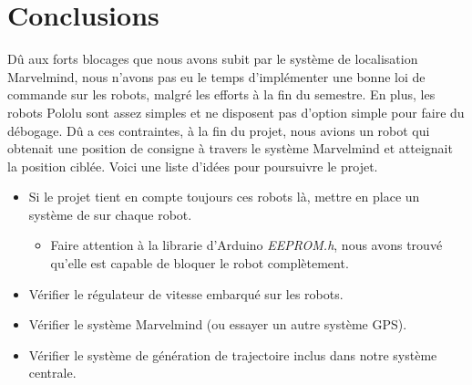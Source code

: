 \section{Conclusions}

Dû aux forts blocages que nous avons subit par le système de localisation Marvelmind, nous n'avons pas eu le temps d'implémenter une bonne loi de commande sur les robots, malgré les efforts à la fin du semestre. En plus, les robots Pololu sont assez simples et ne disposent pas d'option simple pour faire du débogage. Dû a ces contraintes, à la fin du projet, nous avions un robot qui obtenait une position de consigne à travers le système Marvelmind et atteignait la position ciblée. Voici une liste d'idées pour poursuivre le projet. 

\begin{itemize}
    \item Si le projet tient en compte toujours ces robots là, mettre en place un système de \og {} \fg{} sur chaque robot. 
\begin{itemize}
    \item Faire attention à la librarie d'Arduino \textit{EEPROM.h}, nous avons trouvé qu'elle est capable de bloquer le robot complètement. 
\end{itemize}
    \item Vérifier le régulateur de vitesse embarqué sur les robots.
    \item Vérifier le système Marvelmind (ou essayer un autre système GPS). 
    \item Vérifier le système de génération de trajectoire inclus dans notre système centrale. 
\end{itemize}